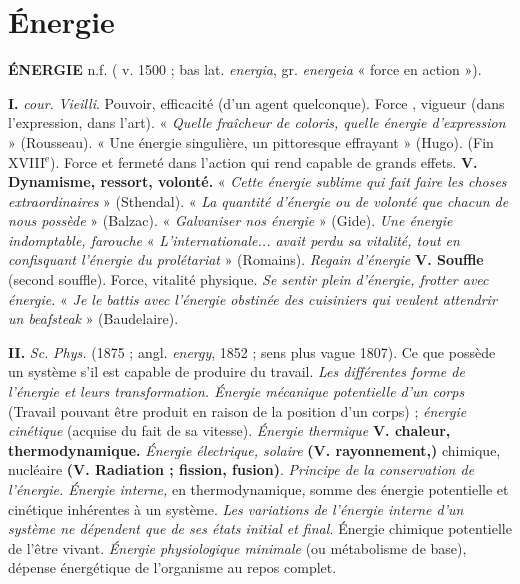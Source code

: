 \section{Énergie}
{\bf ÉNERGIE} {\sf n.f.} ( v. 1500 ; bas lat. {\it energia}, gr. {\it energeia} « force en action »).

{\bf I.} {\it cour.}  {\it Vieilli}. Pouvoir, efficacité (d'un agent quelconque). \lb Force , vigueur (dans l'expression, dans l'art). « {\it Quelle fraîcheur de coloris, quelle énergie d'expression} » ({\sc Rousseau}). « Une énergie singulière, un pittoresque effrayant » ({\sc Hugo}).
%
(Fin {\footnotesize XVIII}$^\text{e}$). Force et fermeté dans l'action qui rend capable de grands effets. {\bf V. Dynamisme, ressort, volonté.} « {\it Cette énergie sublime qui fait faire les choses extraordinaires} » ({\sc Sthendal}). « {\it La quantité d'énergie ou de volonté que chacun de nous possède} » ({\sc Balzac}). « {\it Galvaniser nos énergie} » ({\sc Gide}). {\it Une énergie indomptable, farouche} « {\it L'internationale... avait perdu sa vitalité, tout en confisquant l'énergie du prolétariat} » ({\sc Romains}). {\it Regain d'énergie} {\bf V. Souffle} (second souffle). \lb Force, vitalité physique. {\it Se sentir plein d'énergie, frotter avec énergie.} « {\it Je le battis avec l'énergie obstinée des cuisiniers qui veulent attendrir un beafsteak} » ({\sc Baudelaire}).

{\bf II.} {\it Sc.}  {\it Phys.} (1875 ; angl. {\it energy}, 1852 ; sens plus vague 1807). Ce que possède un système s'il est capable de produire du travail. {\it Les différentes forme de l'énergie et leurs transformation. Énergie mécanique potentielle d'un corps} (Travail pouvant être produit en raison de la position d'un corps) ; {\it énergie cinétique} (acquise du fait de sa vitesse). {\it Énergie thermique} {\bf V. chaleur, thermodynamique.} {\it Énergie électrique, solaire} {\bf (V. rayonnement,)} chimique, nucléaire  {\bf (V. Radiation ; fission, fusion)}. {\it Principe de la conservation de l'énergie. Énergie interne,} en thermodynamique, somme des énergie potentielle et cinétique inhérentes à un système. {\it Les variations de l'énergie interne d'un système ne dépendent que de ses états initial et final.}  Énergie chimique potentielle de l'être vivant. {\it Énergie physiologique minimale} (ou métabolisme de base), dépense énergétique de l'organisme au repos complet.

